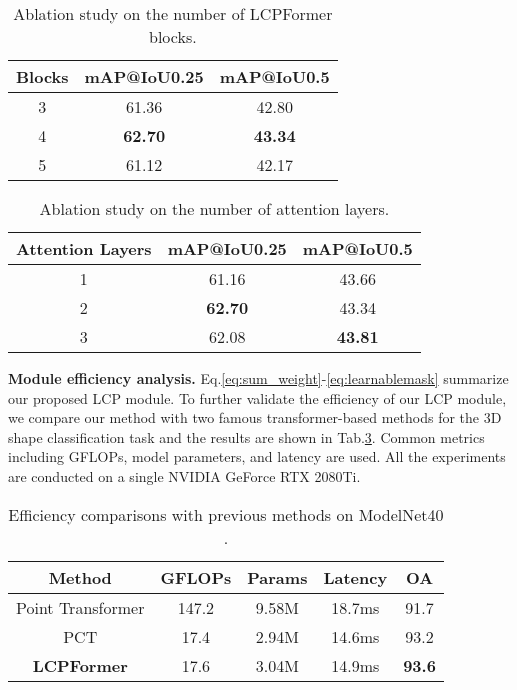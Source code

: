 \documentclass[lettersize,journal]{IEEEtran}
\begin{document}
\begin{table}[htbp]
\caption{Ablation study on the number of LCPFormer blocks.} 
\centering
{\begin{tabular}{c|c|c}
\toprule
Blocks & mAP@IoU0.25 & mAP@IoU0.5 \\
\toprule
3  & 61.36 & 42.80 \\
4  & {\bf62.70} & {\bf43.34} \\
5  & 61.12 & 42.17 \\
\bottomrule
\end{tabular}}
\label{abla: nblock}
\end{table}


\begin{table}[htbp]
\caption{Ablation study on the number of attention layers. }
\centering
{\begin{tabular}{c|c|c}
\toprule
Attention Layers & mAP@IoU0.25 & mAP@IoU0.5 \\
\toprule
1  & 61.16 & 43.66 \\
2  & {\bf62.70} & 43.34 \\
3  & 62.08 & {\bf43.81} \\
\bottomrule
\end{tabular}}
\label{abla:nlayer}
\end{table}


{\bf Module efficiency analysis.}\label{lightweight}
Eq.\ref{eq:sum_weight}-\ref{eq:learnablemask} summarize our proposed LCP module.
To further validate the efficiency of our LCP module, we compare our method with two famous transformer-based methods for the 3D shape classification task and the results are shown in Tab.\ref{efficiency}. 
Common metrics including GFLOPs, model parameters, and latency are used. All the experiments are conducted on a single NVIDIA GeForce RTX 2080Ti.

\begin{table}[htbp]
\caption{Efficiency comparisons with previous methods on ModelNet40 \cite{modelnet40dataset}.}
\centering
{\begin{tabular}{c|c|c|c|c}
    \toprule
    Method & GFLOPs & Params & Latency & OA \\
    \toprule
    Point Transformer  & 147.2 & 9.58M & 18.7ms & 91.7 \\
    PCT  & 17.4 & 2.94M & 14.6ms &  93.2\\
    \textbf{LCPFormer} & 17.6 & 3.04M & 14.9ms & \textbf{93.6} \\
    \bottomrule
\end{tabular}}
\label{efficiency}
\end{table}
\end{document}

